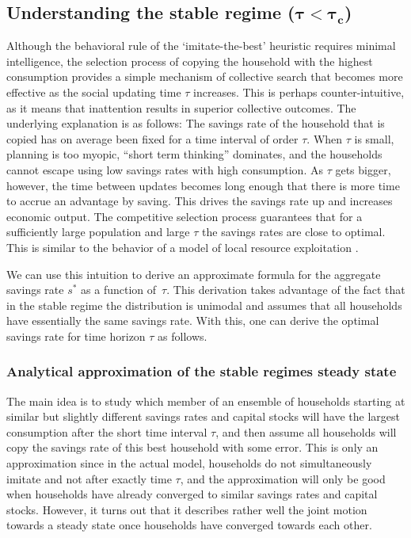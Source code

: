 \subsection{Understanding the stable regime ($\mathbf{\tau \! < \! \tau_{c} }$)}
\label{sec:savings_stable}
Although the behavioral rule of the `imitate-the-best' heuristic requires minimal intelligence, the selection process of copying the household with the highest consumption provides a simple mechanism of collective search that becomes more effective as the social updating time $\tau$ increases.  This is perhaps counter-intuitive, as it means that inattention results in superior collective outcomes. The underlying explanation is as follows:  The  savings rate of the household that is copied has on average been fixed for a time interval of order $\tau$. When $\tau$ is small, planning is too myopic, ``short term thinking'' dominates, and the households cannot escape using low savings rates with high consumption.  As $\tau$ gets bigger, however, the time between updates becomes long enough that there is more time to accrue an advantage by saving. This drives the savings rate up and increases economic output. The competitive selection process guarantees that for a sufficiently large population and large $\tau$ the savings rates are close to optimal. This is similar to the behavior of a model of local resource exploitation \cite{Wiedermann2015}.

We can use this intuition to derive an approximate formula for the aggregate savings rate $s^*$ as a function of~$\tau$. This derivation takes advantage of the fact that in the stable regime the distribution is unimodal and assumes that all households have essentially the same savings rate. With this, one can derive the optimal savings rate for time horizon $\tau$ as follows.\\ 

\subsubsection{Analytical approximation of the stable regimes steady state}
\label{sec:rck_stable}
The main idea is to study which member of an ensemble of households starting at similar but slightly different savings rates and capital stocks will have the largest consumption after the short time interval $\tau$, and then assume all households will copy the savings rate of this best household with some error. 
This is only an approximation since in the actual model, households do not simultaneously imitate and not after exactly time $\tau$, and the approximation will only be good when households have already converged to similar savings rates and capital stocks.
However, it turns out that it describes rather well the joint motion towards a steady state once households have converged towards each other.

